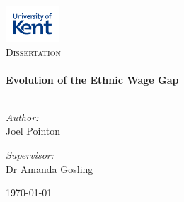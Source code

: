 \begin{titlepage}
\vbox{ }

\vbox{ }

\begin{center}
\includegraphics[width=0.15\textwidth]{./images/kent_logo.jpg}\\[1cm]
\textsc{\LARGE Dissertation}\\[1.5cm]

\vbox{ }
\HRule \\[0.4cm]
{ \huge \bfseries Evolution of the Ethnic Wage Gap}\\[0.4cm]
\HRule \\[1.5cm]
\begin{minipage}{0.4\textwidth}
\begin{flushleft} \large
\emph{Author:}\\
Joel Pointon
\end{flushleft}
\end{minipage}
\begin{minipage}{0.4\textwidth}
\begin{flushright} \large
\emph{Supervisor:} \\
Dr Amanda Gosling
\end{flushright}
\end{minipage}
\vfill
{\large \today}

\end{center}
\end{titlepage}